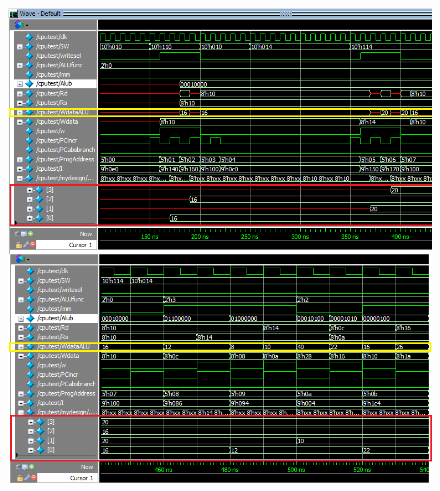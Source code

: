 \begin{figure}[H]
		\centering
		\includegraphics[width = \textwidth]{Figures/icputest_1}		
\end{figure}

